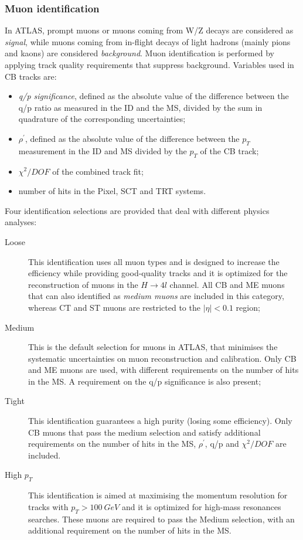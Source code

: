 \documentclass[a4paper,twoside,12pt]{article}
\begin{document}
\subsubsection*{Muon identification}
In ATLAS, prompt muons or muons coming from W/Z decays are considered as \textit{signal}, 
while muons coming from in-flight decays of light hadrons (mainly pions and kaons) 
are considered \textit{background}. 
Muon identification is performed by applying track quality requirements that
suppress background. Variables used in CB tracks are:
\begin{itemize}
\item \textit{q/p significance}, defined as the absolute value of the difference between the q/p
ratio as measured in the ID and the MS, divided by the sum in quadrature of the corresponding
uncertainties;
\item $\mathit{\rho^{'}}$, defined as the absolute value of the difference between the $p_{T}$
measurement in the ID and MS divided by the $p_{T}$ of the CB track;
\item $\chi^{2}/DOF$ of the combined track fit;
\item number of hits in the Pixel, SCT and TRT systems.
\end{itemize}

Four identification selections are provided that deal with different physics analyses:
\begin{description}
\item [Loose] This identification uses all muon types and is designed to increase the efficiency while providing
good-quality tracks and it is optimized for the reconstruction of muons in the $H \rightarrow 4l$ channel. All CB and ME muons that can also identified as \textit{medium muons} are included in this category, whereas CT and ST muons are restricted to the $|\eta| < 0.1$ region;
\item [Medium] This is the default selection for muons in ATLAS, that minimises
the systematic uncertainties on muon reconstruction and calibration. Only CB and ME
muons are used, with different requirements on the number of hits in the MS. A requirement
on the q/p significance is also present;
\item [Tight] This identification guarantees a high purity (losing some efficiency). Only
CB muons that pass the medium selection and satisfy additional requirements on the number
of hits in the MS, $\rho^{'}$, q/p and $\chi^{2}/DOF$ are included. 
\item [High \boldmath$p_{T}$] This identification is aimed at maximising the momentum resolution
for tracks with $p_{T} > 100\ GeV$ and it is optimized for high-mass resonances searches. 
These muons are required to pass the Medium selection, with an additional requirement on 
the number of hits in the MS. 
\end{description}
\end{document}

